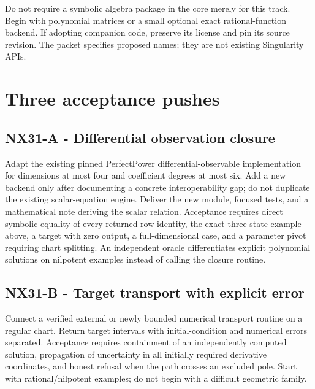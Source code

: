 \documentclass[
  11pt,
  a4paper,
]{report}
\begin{document}
Do not require a symbolic algebra package in the core merely for this
track. Begin with polynomial matrices or a small optional exact
rational-function backend. If adopting companion code, preserve its
license and pin its source revision. The packet specifies proposed
names; they are not existing Singularity APIs.

\hypertarget{three-acceptance-pushes-7}{%
\section{Three acceptance pushes}\label{three-acceptance-pushes-7}}

\hypertarget{nx31-a---differential-observation-closure}{%
\subsection{NX31-A - Differential observation
closure}\label{nx31-a---differential-observation-closure}}

Adapt the existing pinned PerfectPower differential-observable
implementation for dimensions at most four and coefficient degrees at
most six. Add a new backend only after documenting a concrete
interoperability gap; do not duplicate the existing scalar-equation
engine. Deliver the new module, focused tests, and a mathematical note
deriving the scalar relation. Acceptance requires direct symbolic
equality of every returned row identity, the exact three-state example
above, a target with zero output, a full-dimensional case, and a
parameter pivot requiring chart splitting. An independent oracle
differentiates explicit polynomial solutions on nilpotent examples
instead of calling the closure routine.

\hypertarget{nx31-b---target-transport-with-explicit-error}{%
\subsection{NX31-B - Target transport with explicit
error}\label{nx31-b---target-transport-with-explicit-error}}

Connect a verified external or newly bounded numerical transport routine
on a regular chart. Return target intervals with initial-condition and
numerical errors separated. Acceptance requires containment of an
independently computed solution, propagation of uncertainty in all
initially required derivative coordinates, and honest refusal when the
path crosses an excluded pole. Start with rational/nilpotent examples;
do not begin with a difficult geometric family.
\end{document}
